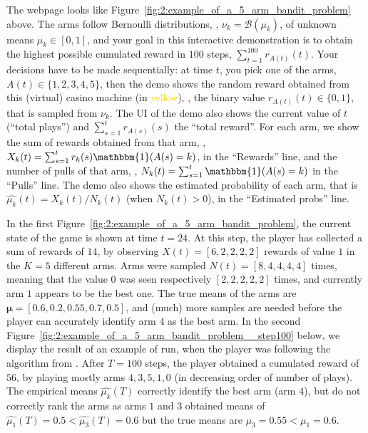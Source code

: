 The webpage looks like Figure~\ref{fig:2:example_of_a_5_arm_bandit_problem} above.
The arms follow Bernoulli distributions, \ie, $\nu_k = \mathcal{B}(\mu_k)$, of unknown means $\mu_k\in[0,1]$, and your goal in this interactive demonstration is to obtain the highest possible cumulated reward in $100$ steps, $\sum_{t=1}^{100} r_{A(t)}(t)$.
Your decisions have to be made sequentially: at time $t$, you pick one of the arms, $A(t) \in\{1,2,3,4,5\}$, then the demo shows the random reward obtained from this (virtual) casino machine (in \textcolor{gold}{yellow}), \ie, the binary value $r_{A(t)}(t)\in\{0,1\}$, that is sampled \iid{} from $\nu_k$.
%
The UI of the demo also shows the current value of $t$ (``total plays'') and $\sum_{s=1}^t r_{A(s)}(s)$ the ``total reward''.
For each arm, we show the sum of rewards obtained from that arm, \ie, $X_k(t) = \sum_{s=1}^t r_k(s) \mathbbm{1}(A(s) = k)$, in the ``Rewards'' line, and the number of pulls of that arm, \ie, $N_k(t) = \sum_{s=1}^t \mathbbm{1}(A(s) = k)$ in the ``Pulls'' line.
%
The demo also shows the estimated probability of each arm, that is $\widehat{\mu_k}(t) = X_k(t) / N_k(t)$ (when $N_k(t)>0$), in the ``Estimated probs'' line.

In the first Figure~\ref{fig:2:example_of_a_5_arm_bandit_problem}, the current state of the game is shown at time $t=24$.
At this step, the player has collected a sum of rewards of $14$, by observing $X(t) = [6,2,2,2,2]$ rewards of value $1$ in the $K=5$ different arms. Arms were sampled $N(t) = [8,4,4,4,4]$ times, meaning that the value $0$ was seen respectively $[2,2,2,2,2]$ times, and currently arm $1$ appears to be the best one. The true means of the arms are $\bm{\mu}=[0.6, 0.2, 0.55, 0.7, 0.5]$, and (much) more samples are needed before the player can accurately identify arm $4$ as the best arm.
%
In the second Figure~\ref{fig:2:example_of_a_5_arm_bandit_problem__step100} below, we display the result of an example of run, when the player was following the \UCB{} algorithm from \cite{Auer02}.
After $T=100$ steps, the player obtained a cumulated reward of $56$, by playing mostly arms $4,3,5,1,0$ (in decreasing order of number of plays). The empirical means $\widehat{\mu_k}(T)$ correctly identify the best arm (arm $4$), but do not correctly rank the arms as arms $1$ and $3$ obtained means of $\widehat{\mu_1}(T) = 0.5 < \widehat{\mu_3}(T)=0.6$ but the true means are $\mu_3 = 0.55 < \mu_1 = 0.6$.

